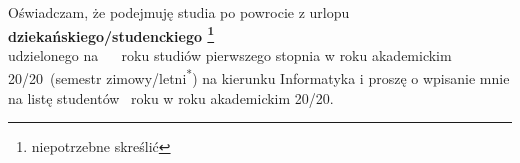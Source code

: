 \documentclass{wmiisubmission}
\begin{document}
\cracowdate
{}
\studentaddress
\addressee{\piotrniemiec}

\vskip 3.0cm


\vskip 0.5cm

Oświadczam, że podejmuję studia po powrocie z urlopu \textbf{dziekańskiego/studenckiego
\footnote[1]{niepotrzebne skreślić}}\\ udzielonego na ~\fillField{3cm}~ roku
studiów pierwszego stopnia w roku akademickim \\
20\fillField{0.7cm}/20\fillField{0.7cm}~(semestr zimowy/letni\textsuperscript{*})
na kierunku Informatyka i proszę o wpisanie mnie na listę studentów \fillField{3cm}
~roku w roku akademickim 20\fillField{0.7cm}/20\fillField{0.7cm}.

\vskip 2.0cm

\studentsignature
\end{document}
